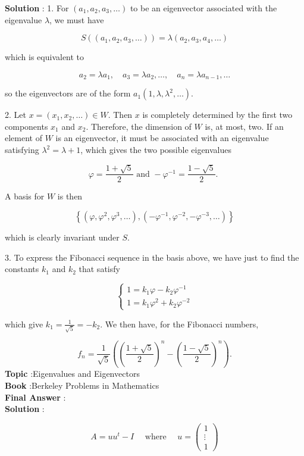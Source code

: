 \documentclass[10pt]{article}
\begin{document}
\textbf{Solution} : 1. For $\left(a_{1}, a_{2}, a_{3}, \ldots\right)$ to be an eigenvector associated with the eigenvalue $\lambda$, we must have

$$
S\left(\left(a_{1}, a_{2}, a_{3}, \ldots\right)\right)=\lambda\left(a_{2}, a_{3}, a_{4}, \ldots\right)
$$

which is equivalent to

$$
a_{2}=\lambda a_{1}, \quad a_{3}=\lambda a_{2}, \ldots, \quad a_{n}=\lambda a_{n-1}, \ldots
$$

so the eigenvectors are of the form $a_{1}\left(1, \lambda, \lambda^{2}, \ldots\right)$.

2. Let $x=\left(x_{1}, x_{2}, \ldots\right) \in W$. Then $x$ is completely determined by the first two components $x_{1}$ and $x_{2}$. Therefore, the dimension of $W$ is, at most, two. If an element of $W$ is an eigenvector, it must be associated with an eigenvalue satisfying $\lambda^{2}=\lambda+1$, which gives the two possible eigenvalues

$$
\varphi=\frac{1+\sqrt{5}}{2} \text { and }-\varphi^{-1}=\frac{1-\sqrt{5}}{2} \text {. }
$$

A basis for $W$ is then

$$
\left\{\left(\varphi, \varphi^{2}, \varphi^{3}, \ldots\right),\left(-\varphi^{-1}, \varphi^{-2},-\varphi^{-3}, \ldots\right)\right\}
$$

which is clearly invariant under $S$.

3. To express the Fibonacci sequence in the basis above, we have just to find the constants $k_{1}$ and $k_{2}$ that satisfy

$$
\left\{\begin{array}{l}
1=k_{1} \varphi-k_{2} \varphi^{-1} \\
1=k_{1} \varphi^{2}+k_{2} \varphi^{-2}
\end{array}\right.
$$

which give $k_{1}=\frac{1}{\sqrt{5}}=-k_{2}$. We then have, for the Fibonacci numbers,

$$
f_{n}=\frac{1}{\sqrt{5}}\left(\left(\frac{1+\sqrt{5}}{2}\right)^{n}-\left(\frac{1-\sqrt{5}}{2}\right)^{n}\right) .
$$
\textbf{Topic} :Eigenvalues and Eigenvectors \\
\textbf{Book} :Berkeley Problems in Mathematics\\
\textbf{Final Answer} :\\


\textbf{Solution} :

$$
A=u u^{t}-I \quad \text { where } \quad u=\left(\begin{array}{c}
1 \\
\vdots \\
1
\end{array}\right)
$$
\end{document}
